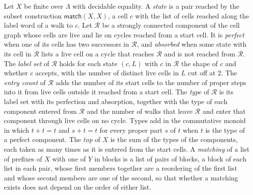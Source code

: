 \documentclass{lmcs}
\theoremstyle{definition}
\theoremstyle{remark}
\providecommand{\matchB}{\mathsf{match}}
\begin{document}
Let $X$ be finite over $\Lambda$ with decidable equality. A \emph{state} is a pair reached by the subset construction
$\matchB(X,X)$, a cell $c$ with the list of cells reached along the label word of a walk to $c$.
Let $\mathcal R$ be a strongly connected component of the cell graph whose cells are live and lie on cycles reached from a start
cell. It is \emph{perfect} when one of its cells has two successors in $\mathcal R$, and
\emph{absorbed} when some state with its cell in $\mathcal R$ lists a live cell on a cycle that reaches $\mathcal R$ and is not reached
from $\mathcal R$. The \emph{label set} of $\mathcal R$ holds for each state $(c,L)$ with $c$ in $\mathcal R$ the shape
of $c$ and whether $c$ accepts, with the number of distinct live cells in $L$ cut off at $2$.
The \emph{entry count} of $\mathcal R$ adds the number of its start cells to the number of proper steps into it from live cells
outside it reached from a start cell. The \emph{type} of $\mathcal R$ is its label set with its
perfection and absorption, together with the type of each component entered from $\mathcal R$ and the number of walks that
leave $\mathcal R$ and enter that component through live cells on no cycle. Types add in the commutative
monoid in which $t+t=t$ and $s+t=t$ for every proper part $s$ of $t$ when $t$ is the type of a perfect
component. The \emph{top} of $X$ is the sum of the types of the components, each taken as many
times as it is entered from the start cells. A
\emph{matching} of a list of prefixes of $X$ with one of $Y$ in blocks is a list of pairs of blocks, a block of each
list in each pair, whose first members together are a reordering of the first list and whose second members are one of
the second, so that whether a matching exists does not depend on the order of either list.
\end{document}
